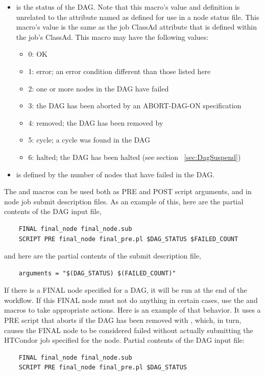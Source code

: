 \begin{itemize}
\item {} is the status of the DAG.
Note that this macro's value and definition is unrelated to the attribute 
named  as defined for use in a node status file.
This macro's value is the same as the job ClassAd attribute 
that is defined within the  job's ClassAd.
This macro may have the following values:
\begin{itemize}
\item 0: OK
\item 1: error; an error condition different than those listed here
\item 2: one or more nodes in the DAG have failed
\item 3: the DAG has been aborted by an ABORT-DAG-ON specification
\item 4: removed; the DAG has been removed by 
\item 5: cycle; a cycle was found in the DAG
\item 6: halted; the DAG has been halted (see section ~\ref{sec:DagSuspend})
\end{itemize}

\item {} is defined by the number of nodes that have failed in the
DAG.
\end{itemize}

The  and  macros can be used both
as PRE and POST script arguments, and in node job submit description files.
As an example of this, here are the partial contents of the DAG input file,
\begin{verbatim}
    FINAL final_node final_node.sub
    SCRIPT PRE final_node final_pre.pl $DAG_STATUS $FAILED_COUNT
\end{verbatim}

and here are the partial contents of the submit description file, 
\begin{verbatim}
    arguments = "$(DAG_STATUS) $(FAILED_COUNT)"
\end{verbatim}

If there is a FINAL node specified for a DAG, 
it will be run at the end of the workflow.
If this FINAL node must not do anything in certain cases, 
use the  and 
macros to take appropriate actions.  
Here is an example of that behavior.
It uses a PRE script that aborts if the DAG has been removed with ,
which, in turn,
causes the FINAL node to be considered failed without actually submitting the
HTCondor job specified for the node.
Partial contents of the DAG input file:
\begin{verbatim}
    FINAL final_node final_node.sub
    SCRIPT PRE final_node final_pre.pl $DAG_STATUS
\end{verbatim}

